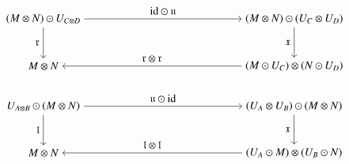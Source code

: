 \begin{enumerate}

\begin{equation}\label{eq:mondoub2}
\begin{aligned}
\begin{tikzpicture}[xscale=2, yscale=1.5]
\node (tl) at (0,2) {$(M \tens N) \odot U_{C \tens D}$};
\node (tr) at (4,2) {$(M \tens N) \odot ( U_C \tens U_D)$};
\node (ml) at (0,1) {$M \tens N$};
\node (mr) at (4,1) {$(M \odot U_C) \tens (N \odot U_D)$};
\draw[->] (tl) to node[above] {$\id \odot \fu$} (tr);
\draw[->] (tl) to node[left]{$\fr$} (ml);
\draw[->] (tr) to node[left]{$\fx$} (mr);
\draw[->] (mr) to node[above] {$\fr \tens \fr$} (ml);
\end{tikzpicture}
    \end{aligned}
\end{equation}

    
    \begin{equation}\label{eq:mondoub3}
\begin{aligned}
\begin{tikzpicture}[xscale=2, yscale=1.5]
\node (tl) at (0,2) {$U_{A \tens B} \odot (M \tens N) $};
\node (tr) at (4,2) {$(U_A \tens U_B) \odot (M \tens N) $};
\node (ml) at (0,1) {$M \tens N$};
\node (mr) at (4,1) {$(U_A \odot M ) \tens (U_B \odot N)$};
\draw[->] (tl) to node[above] {$\fu \odot \id$} (tr);
\draw[->] (tl) to node[left]{$\fl$} (ml);
\draw[->] (tr) to node[left]{$\fx$} (mr);
\draw[->] (mr) to node[above] {$\fl \tens \fl$} (ml);
\end{tikzpicture}
    \end{aligned}
\end{equation}


\end{enumerate}
